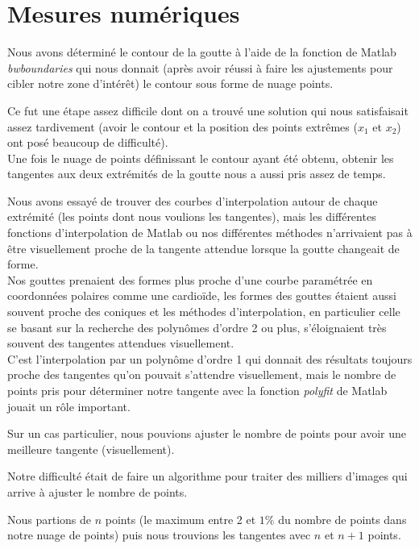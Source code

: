 \section{Mesures numériques}

Nous avons déterminé le contour de la goutte à l'aide de la fonction de Matlab \emph{bwboundaries} qui nous donnait (après avoir réussi à faire les ajustements pour cibler notre zone d'intérêt) le contour sous forme de nuage points.

Ce fut une étape assez difficile dont on a trouvé une solution qui nous satisfaisait assez tardivement (avoir le contour et la position des points extrêmes ($x_{1}$ et $x_{2}$) ont posé beaucoup de difficulté).  \\

Une fois le nuage de points définissant le contour ayant été obtenu, obtenir les tangentes aux deux extrémités de la goutte nous a aussi pris assez de temps.

Nous avons essayé de trouver des courbes d'interpolation autour de chaque extrémité (les points dont nous voulions les tangentes), mais les différentes fonctions d'interpolation de Matlab ou nos différentes méthodes n'arrivaient pas à être visuellement proche de la tangente attendue lorsque la goutte changeait de forme.\\

Nos gouttes prenaient des formes plus proche d'une courbe paramétrée en coordonnées polaires comme une cardioïde, les formes des gouttes étaient aussi souvent proche des coniques et les méthodes d'interpolation, en particulier celle se basant sur la recherche des polynômes d'ordre 2 ou plus, s'éloignaient très souvent des tangentes attendues visuellement.\\

C'est l'interpolation par un polynôme d'ordre 1 qui donnait des résultats toujours proche des tangentes qu'on pouvait s'attendre visuellement, mais le nombre de points pris pour déterminer notre tangente avec la fonction \emph{polyfit} de Matlab jouait un rôle important.

Sur un cas particulier, nous pouvions ajuster le nombre de points pour avoir une meilleure tangente (visuellement).

Notre difficulté était de faire un algorithme pour traiter des milliers d'images qui arrive à ajuster le nombre de points.

Nous partions de $n$ points (le maximum entre 2 et $1\%$ du nombre de points dans notre nuage de points) puis nous trouvions les tangentes avec $n$ et $n+1$ points.


